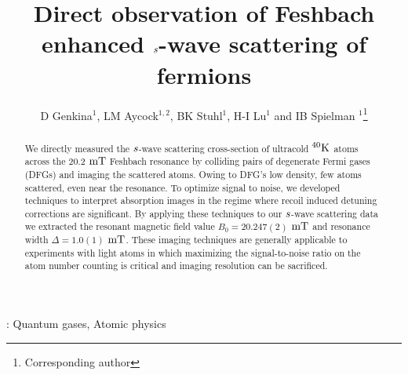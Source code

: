 \documentclass[12pt]{iopart}
\begin{document}
\newcommand{\swave}[0]{$\it{s}$-wave}
\newcommand{\pwave}[0]{$\it{p}$-wave}
\newcommand{\K}{$^{40}\rm{K}$}
\newcommand{\Rb}{$^{87}\rm{Rb}$}
\newcommand{\us}{$\rm{\mu s}$}
\newcommand{\mT}{$\rm{mT}$}
\newcommand{\ez}{$\bf{\hat{e}_z}$}
\newcommand{\ex}{$\bf{\hat{e}_x}$}
\newcommand{\um}{$\rm{\mu m}$}

\title[]{Direct observation of Feshbach enhanced \swave{} scattering of fermions}

\author{D Genkina$^1$, LM Aycock$^{1,2}$, BK Stuhl$^1$, H-I Lu$^1$ and IB Spielman
$^1$\footnote{Corresponding author}}

\address{$^1$Joint Quantum Institute, National Institute of Standards and Technology, and University of Maryland, Gaithersburg, MD, 20899 USA}
\address{$^2$Physics Department, Cornell University, Ithaca, NY 14850 USA}


\begin{abstract}
We directly measured the \swave{} scattering cross-section of ultracold \K{} atoms across the 20.2 \mT{} Feshbach resonance by colliding pairs of degenerate Fermi gases (DFGs) and imaging the scattered atoms. Owing to DFG's low density, few atoms scattered, even near the resonance. To optimize signal to noise, we developed techniques to interpret absorption images in the regime where recoil induced
detuning corrections are significant. By applying these techniques to our \swave{} scattering data we extracted the resonant magnetic
field value  $B_0 = 20.247(2)$  \mT{} and resonance width $\Delta = 1.0(1)$  \mT{}. These imaging techniques are generally applicable to experiments with light atoms in which maximizing the signal-to-noise ratio on the atom number counting is critical and imaging resolution can be sacrificed.
\end{abstract}

\vspace{2pc}
: Quantum gases, Atomic physics

\maketitle
\end{document}
